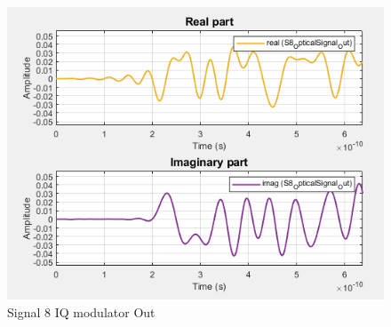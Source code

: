 \begin{figure}[H]
    \centering
    \includegraphics{../lib/m_qam_transmitter/figures/optical_out.png}
    \caption{Signal 8 IQ modulator Out}
    \label{fig:opticalOut}
\end{figure}

